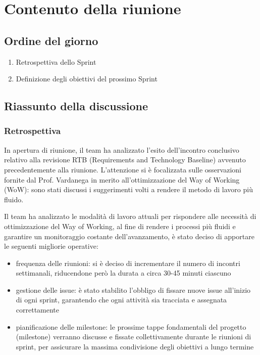 \documentclass[a4paper, 11pt]{article}
\begin{document}
\section{Contenuto della riunione}
\subsection{Ordine del giorno}
\begin{enumerate}
    \item Retrospettiva dello Sprint
    \item Definizione degli obiettivi del prossimo Sprint
\end{enumerate}
\newpage
\subsection{Riassunto della discussione}
\subsubsection{Retrospettiva}
In apertura di riunione, il team ha analizzato l'esito dell'incontro conclusivo relativo alla revisione RTB (Requirements and Technology Baseline) avvenuto precedentemente alla riunione. L'attenzione si è focalizzata sulle osservazioni fornite dal Prof. Vardanega in merito all'ottimizzazione del Way of Working (WoW): sono stati discussi i suggerimenti volti a rendere il metodo di lavoro più fluido.

Il team ha analizzato le modalità di lavoro attuali per rispondere alle necessità di ottimizzazione del Way of Working, al fine di rendere i processi più fluidi e garantire un monitoraggio costante dell'avanzamento, è stato deciso di apportare le seguenti migliorie operative:
\begin{itemize}
    \item frequenza delle riunioni: si è deciso di incrementare il numero di incontri settimanali, riducendone però la durata a circa 30-45 minuti ciascuno 
    \item gestione delle issue: è stato stabilito l'obbligo di fissare nuove issue all'inizio di ogni sprint, garantendo che ogni attività sia tracciata e assegnata correttamente
    \item pianificazione delle milestone: le prossime tappe fondamentali del progetto (milestone) verranno discusse e fissate collettivamente durante le riunioni di sprint, per assicurare la massima condivisione degli obiettivi a lungo termine
\end{itemize}
\end{document}
